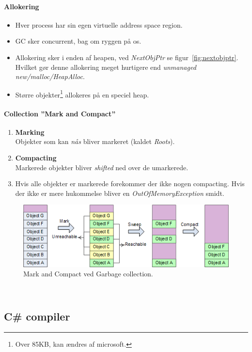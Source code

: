 \paragraph{Allokering}
\begin{itemize}
	\item Hver process har sin egen virtuelle address space region.
	\item GC sker concurrent, bag om ryggen på os.
	\item Allokering sker i enden af heapen, ved \textit{NextObjPtr} se figur~\ref{fig:nextobjptr}. Hvilket gør denne allokering meget hurtigere end \textit{unmanaged} \textit{new/malloc/HeapAlloc}.
	\item Større objekter\footnote{Over 85KB, kan ændres af microsoft.} allokeres på en speciel heap.
\end{itemize}

\paragraph{Collection ''Mark and Compact''}
\begin{enumerate}
	\item \textbf{Marking}\\
	Objekter som kan \textit{nås} bliver markeret (kaldet \textit{Roots}).
	\item \textbf{Compacting}\\
	Markerede objekter bliver \textit{shifted} ned over de umarkerede.
	\item Hvis alle objekter er markerede forekommer der ikke nogen compacting. Hvis der ikke er mere hukommelse bliver en \textit{OutOfMemoryException} smidt.
\end{enumerate}

\begin{figure}[h]
\centering
\includegraphics[width=0.8\linewidth]{figs/markandsweep}
\caption{Mark and Compact ved Garbage collection.}
\label{fig:markandsweep}
\end{figure}

\

\subsection{C\# compiler}


